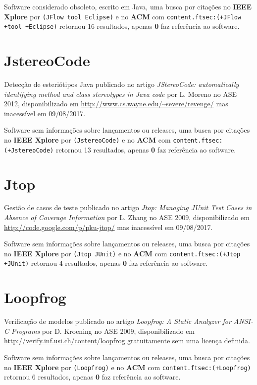 Software considerado obsoleto,
escrito em Java,
uma busca por citações no {\bf IEEE Xplore} por
\texttt{(JFlow tool Eclipse)}
e no {\bf ACM} com
\texttt{content.ftsec:(+JFlow +tool +Eclipse)}
retornou
16 resultados, apenas
{\bf 0} faz referência ao software.



\section{JstereoCode}

Detecção de esteriótipos Java
publicado no artigo {\it JStereoCode: automatically identifying method and class stereotypes in Java code}
por L. Moreno
no ASE 2012,
disponibilizado em \url{http://www.cs.wayne.edu/~severe/revenge/}
mas inacessível em 09/08/2017.

Software sem informações sobre lançamentos ou releases,
uma busca por citações no {\bf IEEE Xplore} por
\texttt{(JstereoCode)}
e no {\bf ACM} com
\texttt{content.ftsec:(+JstereoCode)}
retornou
13 resultados, apenas
{\bf 0} faz referência ao software.



\section{Jtop}

Gestão de casos de teste
publicado no artigo {\it Jtop: Managing JUnit Test Cases in Absence of Coverage Information}
por L. Zhang
no ASE 2009,
disponibilizado em \url{http://code.google.com/p/pku-jtop/}
mas inacessível em 09/08/2017.

Software sem informações sobre lançamentos ou releases,
uma busca por citações no {\bf IEEE Xplore} por
\texttt{(Jtop JUnit)}
e no {\bf ACM} com
\texttt{content.ftsec:(+Jtop +JUnit)}
retornou
4 resultados, apenas
{\bf 0} faz referência ao software.



\section{Loopfrog}

Verificação de modelos
publicado no artigo {\it Loopfrog: A Static Analyzer for ANSI-C Programs}
por D. Kroening
no ASE 2009,
disponibilizado em \url{http://verify.inf.usi.ch/content/loopfrog}
gratuitamente
sem uma licença definida.

Software sem informações sobre lançamentos ou releases,
uma busca por citações no {\bf IEEE Xplore} por
\texttt{(Loopfrog)}
e no {\bf ACM} com
\texttt{content.ftsec:(+Loopfrog)}
retornou
6 resultados, apenas
{\bf 0} faz referência ao software.




